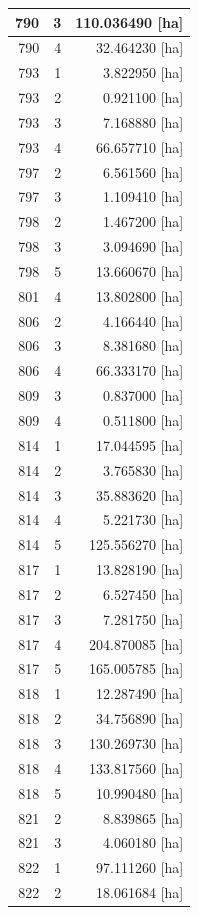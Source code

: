 \documentclass[11pt,]{book}
\begin{document}
\begin{table}
\begin{tabular}[t]{r|r|r}
\hline
790 & 3 & 110.036490 [ha]\\
\hline
790 & 4 & 32.464230 [ha]\\
\hline
793 & 1 & 3.822950 [ha]\\
\hline
793 & 2 & 0.921100 [ha]\\
\hline
793 & 3 & 7.168880 [ha]\\
\hline
793 & 4 & 66.657710 [ha]\\
\hline
797 & 2 & 6.561560 [ha]\\
\hline
797 & 3 & 1.109410 [ha]\\
\hline
798 & 2 & 1.467200 [ha]\\
\hline
798 & 3 & 3.094690 [ha]\\
\hline
798 & 5 & 13.660670 [ha]\\
\hline
801 & 4 & 13.802800 [ha]\\
\hline
806 & 2 & 4.166440 [ha]\\
\hline
806 & 3 & 8.381680 [ha]\\
\hline
806 & 4 & 66.333170 [ha]\\
\hline
809 & 3 & 0.837000 [ha]\\
\hline
809 & 4 & 0.511800 [ha]\\
\hline
814 & 1 & 17.044595 [ha]\\
\hline
814 & 2 & 3.765830 [ha]\\
\hline
814 & 3 & 35.883620 [ha]\\
\hline
814 & 4 & 5.221730 [ha]\\
\hline
814 & 5 & 125.556270 [ha]\\
\hline
817 & 1 & 13.828190 [ha]\\
\hline
817 & 2 & 6.527450 [ha]\\
\hline
817 & 3 & 7.281750 [ha]\\
\hline
817 & 4 & 204.870085 [ha]\\
\hline
817 & 5 & 165.005785 [ha]\\
\hline
818 & 1 & 12.287490 [ha]\\
\hline
818 & 2 & 34.756890 [ha]\\
\hline
818 & 3 & 130.269730 [ha]\\
\hline
818 & 4 & 133.817560 [ha]\\
\hline
818 & 5 & 10.990480 [ha]\\
\hline
821 & 2 & 8.839865 [ha]\\
\hline
821 & 3 & 4.060180 [ha]\\
\hline
822 & 1 & 97.111260 [ha]\\
\hline
822 & 2 & 18.061684 [ha]\\

\end{tabular}
\end{table}
\end{document}
